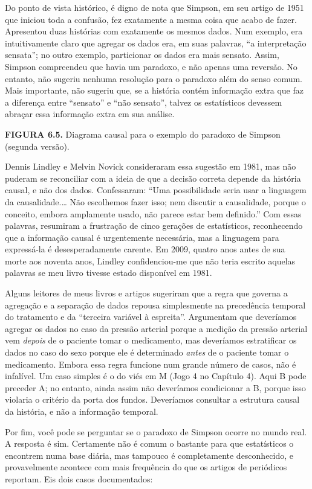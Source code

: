 \documentclass[11pt,a5paper,twoside]{book}
\begin{document}
Do ponto de vista histórico, é digno de nota que Simpson, em seu artigo de 1951 que iniciou toda a confusão, fez exatamente a mesma coisa que acabo de fazer. Apresentou duas histórias com exatamente os mesmos dados. Num exemplo, era intuitivamente claro que agregar os dados era, em suas palavras, “a interpretação sensata”; no outro exemplo, particionar os dados era mais sensato. Assim, Simpson compreendeu que havia um paradoxo, e não apenas uma reversão. No entanto, não sugeriu nenhuma resolução para o paradoxo além do senso comum. Mais importante, não sugeriu que, se a história contém informação extra que faz a diferença entre “sensato” e “não sensato”, talvez os estatísticos devessem abraçar essa informação extra em sua análise.

\textbf{FIGURA 6.5.} Diagrama causal para o exemplo do paradoxo de Simpson (segunda versão).

Dennis Lindley e Melvin Novick consideraram essa sugestão em 1981, mas não puderam se reconciliar com a ideia de que a decisão correta depende da história causal, e não dos dados. Confessaram: “Uma possibilidade seria usar a linguagem da causalidade.… Não escolhemos fazer isso; nem discutir a causalidade, porque o conceito, embora amplamente usado, não parece estar bem definido.” Com essas palavras, resumiram a frustração de cinco gerações de estatísticos, reconhecendo que a informação causal é urgentemente necessária, mas a linguagem para expressá-la é desesperadamente carente. Em 2009, quatro anos antes de sua morte aos noventa anos, Lindley confidenciou-me que não teria escrito aquelas palavras se meu livro tivesse estado disponível em 1981.

Alguns leitores de meus livros e artigos sugeriram que a regra que governa a agregação e a separação de dados repousa simplesmente na precedência temporal do tratamento e da “terceira variável à espreita”. Argumentam que deveríamos agregar os dados no caso da pressão arterial porque a medição da pressão arterial vem \textit{depois} de o paciente tomar o medicamento, mas deveríamos estratificar os dados no caso do sexo porque ele é determinado \textit{antes} de o paciente tomar o medicamento. Embora essa regra funcione num grande número de casos, não é infalível. Um caso simples é o do viés em M (Jogo 4 no Capítulo 4). Aqui B pode preceder A; no entanto, ainda assim não deveríamos condicionar a B, porque isso violaria o critério da porta dos fundos. Deveríamos consultar a estrutura causal da história, e não a informação temporal.

Por fim, você pode se perguntar se o paradoxo de Simpson ocorre no mundo real. A resposta é sim. Certamente não é comum o bastante para que estatísticos o encontrem numa base diária, mas tampouco é completamente desconhecido, e provavelmente acontece com mais frequência do que os artigos de periódicos reportam. Eis dois casos documentados:
\end{document}
